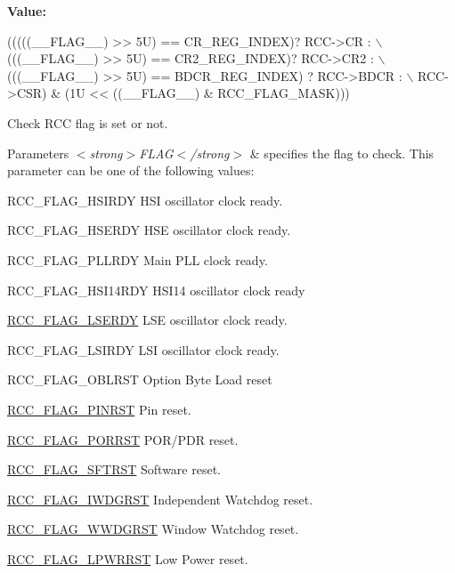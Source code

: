 {\bfseries Value\+:}
\begin{DoxyCode}
(((((\_\_FLAG\_\_) >> 5U) == CR\_REG\_INDEX)? RCC->CR :      \(\backslash\)
                                       (((\_\_FLAG\_\_) >> 5U) == CR2\_REG\_INDEX)? RCC->CR2 :    \(\backslash\)
                                       (((\_\_FLAG\_\_) >> 5U) == BDCR\_REG\_INDEX) ? RCC->BDCR : \(\backslash\)
                                       RCC->CSR) & (1U << ((\_\_FLAG\_\_) & RCC\_FLAG\_MASK)))
\end{DoxyCode}


Check R\+CC flag is set or not. 


\begin{DoxyParams}{Parameters}
{\em $<$strong$>$\+F\+L\+A\+G$<$/strong$>$} & specifies the flag to check. This parameter can be one of the following values\+: \begin{DoxyItemize}
\item R\+C\+C\+\_\+\+F\+L\+A\+G\+\_\+\+H\+S\+I\+R\+DY H\+SI oscillator clock ready. \item R\+C\+C\+\_\+\+F\+L\+A\+G\+\_\+\+H\+S\+E\+R\+DY H\+SE oscillator clock ready. \item R\+C\+C\+\_\+\+F\+L\+A\+G\+\_\+\+P\+L\+L\+R\+DY Main P\+LL clock ready. \item R\+C\+C\+\_\+\+F\+L\+A\+G\+\_\+\+H\+S\+I14\+R\+DY H\+S\+I14 oscillator clock ready \item \hyperlink{group___r_c_c___flag_gac9fb963db446c16e46a18908f7fe1927}{R\+C\+C\+\_\+\+F\+L\+A\+G\+\_\+\+L\+S\+E\+R\+DY} L\+SE oscillator clock ready. \item R\+C\+C\+\_\+\+F\+L\+A\+G\+\_\+\+L\+S\+I\+R\+DY L\+SI oscillator clock ready. \item R\+C\+C\+\_\+\+F\+L\+A\+G\+\_\+\+O\+B\+L\+R\+ST Option Byte Load reset \item \hyperlink{group___r_c_c___flag_gabfc3ab5d4a8a94ec1c9f38794ce37ad6}{R\+C\+C\+\_\+\+F\+L\+A\+G\+\_\+\+P\+I\+N\+R\+ST} Pin reset. \item \hyperlink{group___r_c_c___flag_ga39ad309070f416720207eece5da7dc2c}{R\+C\+C\+\_\+\+F\+L\+A\+G\+\_\+\+P\+O\+R\+R\+ST} P\+O\+R/\+P\+DR reset. \item \hyperlink{group___r_c_c___flag_gaf7852615e9b19f0b2dbc8d08c7594b52}{R\+C\+C\+\_\+\+F\+L\+A\+G\+\_\+\+S\+F\+T\+R\+ST} Software reset. \item \hyperlink{group___r_c_c___flag_gaac46bac8a97cf16635ff7ffc1e6c657f}{R\+C\+C\+\_\+\+F\+L\+A\+G\+\_\+\+I\+W\+D\+G\+R\+ST} Independent Watchdog reset. \item \hyperlink{group___r_c_c___flag_gaa80b60b2d497ccd7b7de1075009999a7}{R\+C\+C\+\_\+\+F\+L\+A\+G\+\_\+\+W\+W\+D\+G\+R\+ST} Window Watchdog reset. \item \hyperlink{group___r_c_c___flag_ga67049531354aed7546971163d02c9920}{R\+C\+C\+\_\+\+F\+L\+A\+G\+\_\+\+L\+P\+W\+R\+R\+ST} Low Power reset. \end{DoxyItemize}
\\
\hline
\end{DoxyParams}

